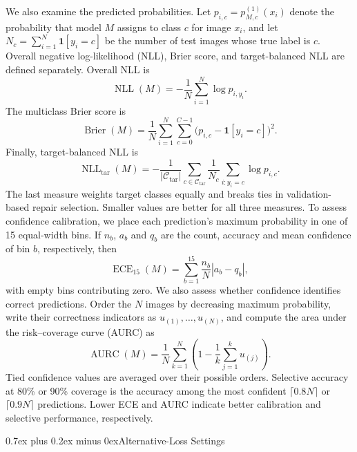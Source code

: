 \documentclass[10pt,journal,compsoc]{IEEEtran}
\makeatletter
\def\section{\@startsection{section}{1}{\z@}{-3.5ex plus -0.5ex minus -1.5ex}%
{0.7ex plus 0.2ex minus 0ex}{\normalfont\sublargesize\sffamily\bfseries\scshape}}
\theoremstyle{definition}
\makeatother
\begin{document}
We also examine the predicted probabilities. Let
$p_{i,c}=p_{M,c}^{(1)}(x_i)$ denote the probability that model $M$
assigns to class $c$ for image $x_i$, and let
$N_c=\sum_{i=1}^{N}\mathbf{1}[y_i=c]$ be the number of test images
whose true label is $c$. Overall negative log-likelihood (NLL), Brier
score, and target-balanced NLL are defined separately. Overall NLL is
\begin{equation}
\label{eq:overall-nll}
\operatorname{NLL}(M)
=-\frac{1}{N}\sum_{i=1}^{N}\log p_{i,y_i}.
\end{equation}
The multiclass Brier score is
\begin{equation}
\label{eq:brier-score}
\operatorname{Brier}(M)
=\frac{1}{N}\sum_{i=1}^{N}\sum_{c=0}^{C-1}
\bigl(p_{i,c}-\mathbf{1}[y_i=c]\bigr)^2.
\end{equation}
Finally, target-balanced NLL is
\begin{equation}
\label{eq:target-balanced-nll}
\operatorname{NLL}_{\mathrm{tar}}(M)
=-\frac{1}{|\mathcal C_{\mathrm{tar}}|}
\sum_{c\in\mathcal C_{\mathrm{tar}}}
\frac{1}{N_c}\sum_{i:y_i=c}\log p_{i,c}.
\end{equation}
The last measure weights target classes equally and breaks ties in
validation-based repair selection. Smaller values are better for all
three measures. To assess confidence calibration, we place each
prediction's maximum probability in one of 15 equal-width bins. If
$n_b$, $a_b$ and $q_b$ are the count, accuracy and mean confidence of
bin $b$, respectively, then
\begin{equation}
\label{eq:ece-metric}
\operatorname{ECE}_{15}(M)=\sum_{b=1}^{15}
\frac{n_b}{N}|a_b-q_b|,
\end{equation}
with empty bins contributing zero. We also assess whether confidence
identifies correct predictions. Order the $N$
images by decreasing maximum probability, write their correctness
indicators as $u_{(1)},\ldots,u_{(N)}$, and compute the area under the
risk--coverage curve (AURC) as
\begin{equation}
\label{eq:aurc-metric}
\operatorname{AURC}(M)=\frac{1}{N}\sum_{k=1}^{N}
\left(1-\frac{1}{k}\sum_{j=1}^{k}u_{(j)}\right).
\end{equation}
Tied confidence values are averaged over their possible orders.
Selective accuracy at 80\% or 90\% coverage is the accuracy among the
most confident $\lceil 0.8N\rceil$ or $\lceil 0.9N\rceil$ predictions.
Lower ECE and AURC indicate better calibration and selective
performance, respectively.

\section{Alternative-Loss Settings}
\label{app:loss-settings}
\end{document}
